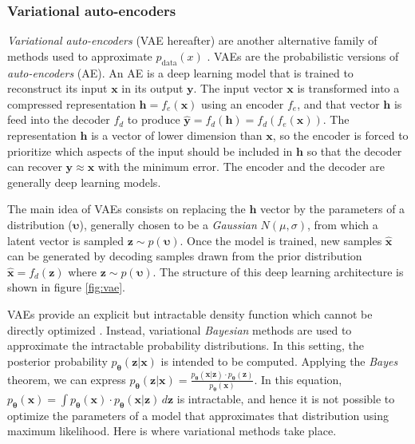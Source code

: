 \subsubsection{Variational auto-encoders}
\textit{Variational auto-encoders} (VAE hereafter) are another alternative family of methods used to approximate $p_\mathrm{data}(x)$ \autocite{kingma2019}. VAEs are the probabilistic versions of \textit{auto-encoders} (AE). An AE is a deep learning model that is trained to reconstruct its input $\mathbf{x}$ in its output $\mathbf{y}$. The input vector $\mathbf{x}$ is transformed into a compressed representation $\mathbf{h}=f_e(\mathbf{x})$ using an encoder $f_e$, and that vector $\mathbf{h}$ is feed into the decoder $f_d$ to produce $\mathbf{\hat{y}}=f_d(\mathbf{h})=f_d(f_e(\mathbf{x}))$. The representation $\mathbf{h}$ is a vector of lower dimension than $\mathbf{x}$, so the encoder is forced to prioritize which aspects of the input should be included in $\mathbf{h}$ so that the decoder can recover $\mathbf{y}\approx \mathbf{x}$ \autocite{Goodfellow2016} with the minimum error. The encoder and the decoder are generally deep learning models.

The main idea of VAEs consists on replacing the $\mathbf{h}$ vector by the parameters of a distribution ($\mathbf{\upsilon}$), generally chosen to be a \textit{Gaussian} $N(\mu,\sigma)$, from which a latent vector is sampled $\mathbf{z} \sim p(\mathbf{\upsilon})$. Once the model is trained, new samples $\mathbf{\hat{x}}$ can be generated by decoding samples drawn from the prior distribution $\mathbf{\hat{x}} = f_d(\mathbf{z})$ where $\mathbf{z} \sim p(\mathbf{\upsilon})$. The structure of this deep learning architecture is shown in figure \ref{fig:vae}.




VAEs provide an explicit but intractable density function which cannot be directly optimized \autocite{Goodfellow2016}. Instead, variational \textit{Bayesian} methods are used to approximate the intractable probability distributions. In this setting, the posterior probability $p_\mathbf{\theta}(\mathbf{z}|\mathbf{x})$ is intended to be computed. Applying the \textit{Bayes} theorem, we can express $p_\mathbf{\theta}(\mathbf{z}|\mathbf{x}) = \frac{p_\mathbf{\theta}(\mathbf{x}|\mathbf{z}) \cdot p_\mathbf{\theta}(\mathbf{z})}{p_\mathbf{\theta}(\mathbf{x})}$. In this equation, $p_\mathbf{\theta}(\mathbf{x}) = \int{p_\mathbf{\theta}(\mathbf{x}) \cdot p_\mathbf{\theta}(\mathbf{x}|\mathbf{z})} \,d\mathbf{z}$ is intractable, and hence it is not possible to optimize the parameters of a model that approximates that distribution using maximum likelihood. Here is where variational methods take place. 

